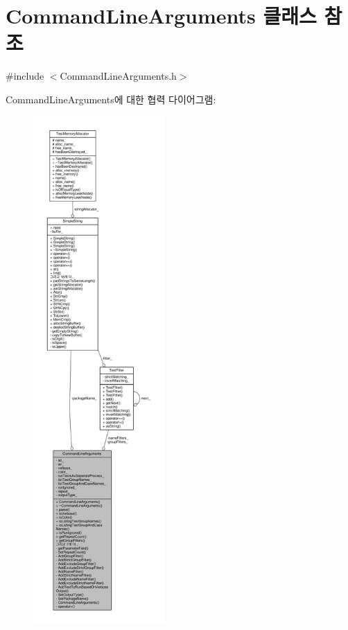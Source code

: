 \hypertarget{class_command_line_arguments}{}\section{Command\+Line\+Arguments 클래스 참조}
\label{class_command_line_arguments}


{\ttfamily \#include $<$Command\+Line\+Arguments.\+h$>$}



Command\+Line\+Arguments에 대한 협력 다이어그램\+:
\nopagebreak
\begin{figure}[H]
\begin{center}
\leavevmode
\includegraphics[height=550pt]{class_command_line_arguments__coll__graph}
\end{center}
\end{figure}
